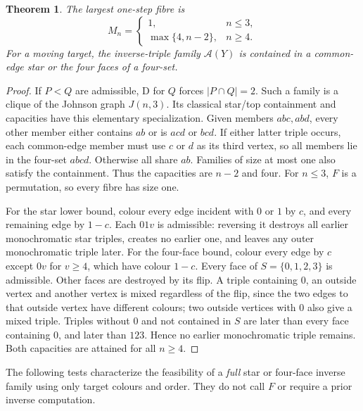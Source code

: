 \documentclass[a4paper,10pt]{amsart}
\newtheorem{theorem}{Theorem}[section]
\theoremstyle{remark}
\newcommand{\A}{\mathcal A}
\begin{document}
\begin{theorem}\label{thm:max}
The largest one-step fibre is
\[
M_n=\begin{cases}1,&n\le3,\\ \max\{4,n-2\},&n\ge4.\end{cases}
\]
For a moving target, the inverse-triple family $\A(Y)$ is contained in
a common-edge star or the four faces of a four-set.
\end{theorem}
\begin{proof}
If $P<Q$ are admissible, D for $Q$ forces $|P\cap Q|=2$. Such a
family is a clique of the Johnson graph $J(n,3)$. Its classical star/top
containment and capacities \cite[Theorem 3.4 and Corollary 3.5]{shuldiner2022clique}
have this elementary specialization. Given members $abc,abd$, every
other member either contains $ab$ or is $acd$ or $bcd$. If either latter
triple occurs, each common-edge member must use $c$ or $d$ as its third
vertex, so all members lie in the four-set $abcd$. Otherwise all share
$ab$. Families of size at most one also satisfy the containment. Thus
the capacities are $n-2$ and four. For $n\le3$, $F$ is a permutation,
so every fibre has size one.

For the star lower bound, colour every edge incident with $0$ or $1$
by $c$, and every remaining edge by $1-c$. Each $01v$ is admissible:
reversing it destroys all earlier monochromatic star triples, creates
no earlier one, and leaves any outer monochromatic triple later.
For the four-face bound, colour every edge by $c$ except $0v$ for
$v\ge4$, which have colour $1-c$. Every face of $S=\{0,1,2,3\}$
is admissible. Other faces are destroyed by its flip. A triple containing
$0$, an outside vertex and another vertex is mixed regardless of the
flip, since the two edges to that outside vertex have different colours;
two outside vertices with $0$ also give a mixed triple. Triples without
$0$ and not contained in $S$ are later than every face containing $0$,
and later than $123$. Hence no earlier monochromatic triple remains.
Both capacities are attained for all $n\ge4$.
\end{proof}

The following tests characterize the feasibility of a \emph{full} star
or four-face inverse family using only target colours and order. They
do not call $F$ or require a prior inverse computation.
\end{document}
